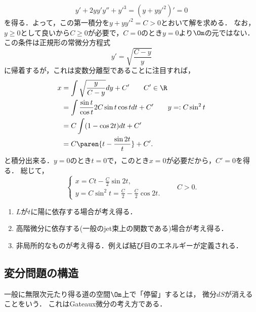 \documentclass[uplatex,dvipdfmx]{jsreport}
\begin{document}
\begin{Proof}
\begin{enumerate}[{Step}1]
        \[y'+2yy'y''+y'^3=(y+yy'^2)'=0\]
        を得る．よって，この第一積分を$y+yy'^2=C>0$とおいて解を求める．
        なお，$y\ge 0$として良いから$C\ge0$が必要で，$C=0$のとき$y=0$より$\Om$の元ではない．
        この条件は正規形の常微分方程式
        \[y'=\sqrt{\frac{C-y}{y}}\]
        に帰着するが，これは変数分離型であることに注目すれば，
        \begin{align*}
            x&=\int\sqrt{\frac{y}{C-y}}dy+C'\qquad C'\in\R\\
            &=\int\frac{\sin t}{\cos t}2C\sin t\cos tdt+C'\qquad y=:C\sin^2t\\
            &=C\int(1-\cos 2t)dt+C'\\
            &=C\paren{t-\frac{\sin 2t}{t}}+C'.
        \end{align*}
        と積分出来る．$y=0$のとき$t=0$で，このとき$x=0$が必要だから，$C'=0$を得る．
        総じて，
        \[\begin{cases}
            x=Ct-\frac{C}{2}\sin 2t,\\
            y=C\sin^2t=\frac{C}{2}-\frac{C}{2}\cos 2t.
        \end{cases}\qquad C>0.\]
    \end{enumerate}
\end{Proof}

\begin{example}[作用汎関数の一般化]\mbox{}
    \begin{enumerate}
        \item $L$が$t$に陽に依存する場合が考え得る．
        \item 高階微分に依存する(一般のjet束上の関数である)場合が考え得る．
        \item 非局所的なものが考え得る．例えば結び目のエネルギーが定義される．
    \end{enumerate}
\end{example}

\subsection{変分問題の構造}

\begin{tcolorbox}[colframe=ForestGreen, colback=ForestGreen!10!white,breakable,colbacktitle=ForestGreen!40!white,coltitle=black,fonttitle=\bfseries\sffamily,
title=]
    一般に無限次元たり得る道の空間$\Om$上で「停留」するとは，
    微分$dS$が消えることをいう．
    これはGateaux微分の考え方である．
\end{tcolorbox}
\end{document}

